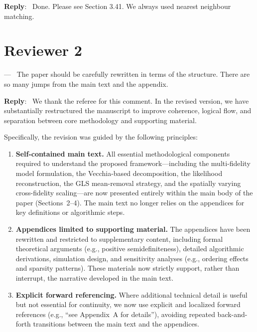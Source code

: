 \documentclass[12pt]{article}
\newcommand{\0}{\mathbf{0}}
\newcounter{reviewer}
\newcounter{point}[reviewer]
\renewcommand{\thepoint}{P\,\thereviewer.\arabic{point}}
\newenvironment{point}
   {\refstepcounter{point} \bigskip \noindent {\textbf{Point~\thepoint} } ---\ }
   {\par }
\newenvironment{reply}
   {\medskip \noindent \begin{sf}\color{Blue}\textbf{Reply}:\  }
   {\medskip \end{sf}}
\begin{document}
\begin{reply}
    Done. Please see Section 3.41. We always used  nearest neighbour matching.
\end{reply}

\section{Reviewer 2}

\begin{point}
    The paper should be carefully rewritten in terms of the structure. There are so many jumps from the main text and the appendix.
\end{point}


\begin{reply}
We thank the referee for this comment. In the revised version, we have substantially restructured the manuscript to improve coherence, logical flow, and separation between core methodology and supporting material.

Specifically, the revision was guided by the following principles:

\begin{enumerate}
    \item \textbf{Self-contained main text.}  
    All essential methodological components required to understand the proposed framework---including the multi-fidelity model formulation, the Vecchia-based decomposition, the likelihood reconstruction, the GLS mean-removal strategy, and the spatially varying cross-fidelity scaling---are now presented entirely within the main body of the paper (Sections~2--4). The main text no longer relies on the appendices for key definitions or algorithmic steps.

    \item \textbf{Appendices limited to supporting material.}  
    The appendices have been rewritten and restricted to supplementary content, including formal theoretical arguments (e.g., positive semidefiniteness), detailed algorithmic derivations, simulation design, and sensitivity analyses (e.g., ordering effects and sparsity patterns). These materials now strictly support, rather than interrupt, the narrative developed in the main text.

    \item \textbf{Explicit forward referencing.}  
    Where additional technical detail is useful but not essential for continuity, we now use explicit and localized forward references (e.g., ``see Appendix~A for details''), avoiding repeated back-and-forth transitions between the main text and the appendices.


\end{enumerate}
\end{reply}
\end{document}
